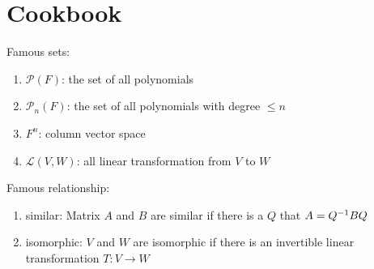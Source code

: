 \section{Cookbook}

Famous sets:
\begin{enumerate}
    \item $\mathcal{P}(F)$: the set of all polynomials
    \item $\mathcal{P}_n (F)$: the set of all polynomials with degree $\leq n$
    \item $F^n$: column vector space
    \item $\mathcal{L}(V,W)$: all linear transformation from $V$ to $W$
\end{enumerate}

Famous relationship:
\begin{enumerate}
    \item similar: Matrix $A$ and $B$ are similar if there is a $Q$ that $A = {Q}^{-1} B Q$
    \item isomorphic: $V$ and $W$ are isomorphic if there is an invertible linear transformation $T:V \rightarrow W$
\end{enumerate}